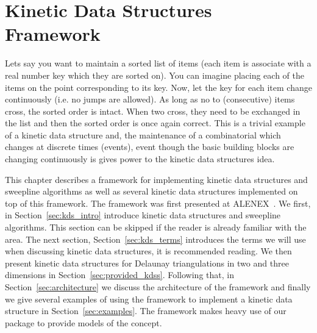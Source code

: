 
\chapter{Kinetic Data Structures Framework}
\label{chapter-kds}
\minitoc






\def\note#1{$\langle\langle${\bf #1}$\rangle\rangle$}




Lets say you want to maintain a sorted list of items (each item is
associate with a real number key which they are sorted on). You can
imagine placing each of the items on the point corresponding to its
key. Now, let the key for each item change continuously (i.e. no jumps
are allowed). As long as no to (consecutive) items cross, the sorted
order is intact. When two cross, they need to be exchanged in the list
and then the sorted order is once again correct. This is a trivial
example of a kinetic data structure and, the maintenance of a
combinatorial which changes at discrete times (events), event though
the basic building blocks are changing continuously is gives power to
the kinetic data structures idea.

This chapter describes a framework for implementing kinetic data
structures and sweepline algorithms as well as several kinetic data
structures implemented on top of this framework. The framework was
first presented at ALENEX~\cite{gkr-cfhm-04}. We first, in
Section~\ref{sec:kds_intro} introduce kinetic data structures and
sweepline algorithms. This section can be skipped if the reader is
already familiar with the area. The next section,
Section~\ref{sec:kds_terms} introduces the terms we will use when
discussing kinetic data structures, it is recommended reading. We then
present kinetic data structures for Delaunay triangulations in two and
three dimensions in Section~\ref{sec:provided_kdss}. Following that,
in Section~\ref{sec:architecture} we discuss the architecture of the
framework and finally we give several examples of using the framework
to implement a kinetic data structure in
Section~\ref{sec:examples}. The framework makes heavy use of our
 package to provide models of the 
concept.

